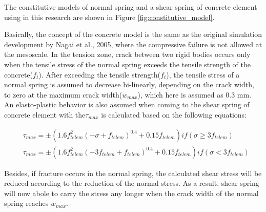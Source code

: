 The constitutive models of normal spring and a shear spring of concrete element using in this research are shown in Figure \ref{fig:constitutive_model}.

Basically, the concept of the concrete model is the same as the original simulation development by Nagai et al., 2005, where the compressive failure is not allowed at the mesoscale. In the tension zone, crack between two rigid bodies occurs only when the tensile stress of the normal spring exceeds the tensile strength of the concrete($f_t$). After exceeding the tensile strength($f_t$), the tensile stress of a normal spring is assumed to decrease bi-linearly, depending on the crack width, to zero at the maximum crack width($w_{max}$), which here is assumed as 0.3 mm. An elasto-plastic behavior is also assumed when coming to the shear spring of concrete element with the$\tau_{max}$ is calculated based on the following equations:

\begin{equation}
  \begin{aligned}
  &\tau_{max} = \pm (1.6f_{telem}^2 (-\sigma + f_{telem})^0.4 + 0.15f_{telem}) if (\sigma \geq 3f_{telem})\\
  &\tau_{max} = \pm (1.6f_{telem}^2 (-3f_{telem} + f_{telem})^0.4 + 0.15f_{telem}) if (\sigma < 3f_{telem})
  \end{aligned}
\end{equation}

Besides, if fracture occurs in the normal spring, the calculated shear stress will be reduced according to the reduction of the normal stress. As a result, shear spring will now abole to carry the stress any longer when the crack width of the normal spring reaches $w_{max}$.
